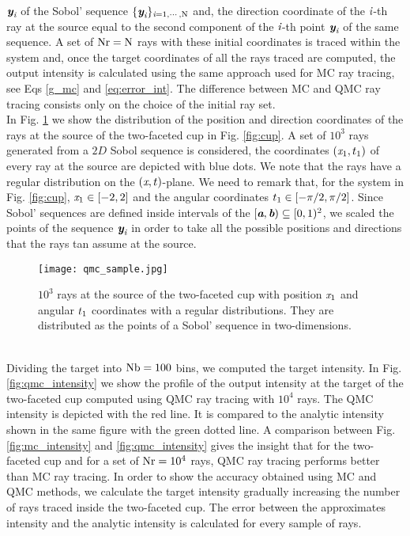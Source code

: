 $\textit{\textbf{y}}_{\textit{i}}$ of the Sobol' sequence  $\{\textit{\textbf{y}}_{\textit{i}}\}_{\textit{i}=1, \cdots, \textrm{N}}$ and, the direction coordinate of the $\textit{i}$-th ray at the source equal to the second component of the $\textit{i}$-th point 
$\textit{\textbf{y}}_{\textit{i}}$ of the same sequence. A set of $\textrm{Nr} = \textrm{N}$ rays with these initial coordinates is traced within the system and, once the target coordinates of all the rays traced are computed, the output intensity is calculated using the same approach used for MC ray tracing, see Eqs \ref{g_mc} and \ref{eq:error_int}. The difference between MC and QMC ray tracing consists only on the choice of the initial ray set.\\ \indent
In Fig. \ref{fig:qmc_sample} we show the distribution of the position and direction coordinates of the rays at the source of the two-faceted cup in Fig. \ref{fig:cup}. 
A set of $10^3$ rays generated from a $2D$ Sobol sequence is considered, the coordinates $(\textit{x}_1, t_1)$ of every ray at the source are depicted with blue dots.
We note that the rays have a regular distribution on the $(\textit{x}, t)$-plane.
We need to remark that, for the system in Fig. \ref{fig:cup}, $\textit{x}_1 \in[-2,2]$ and the angular coordinates $t_1 \in[-\pi/2, \pi/2]$. 
Since Sobol' sequences are defined inside intervals of the  $[\textit{\textbf{a}}, \textit{\textbf{b}})\subseteq[0,1)^2$, we scaled the points of the sequence $\textit{\textbf{y}}_{\textit{i}}$ in order to take all the possible positions and directions that the rays tan assume at the source. 
\begin{figure}[h]
\begin{center}
    \texttt{[image: qmc\_sample.jpg]}
    \caption{$10^3$ rays at the source of the two-faceted cup with position $\textit{x}_1$ and angular $t_1$ coordinates with a regular distributions.
They are distributed as the points of a Sobol' sequence in two-dimensions.}
    \label{fig:qmc_sample}
\end{center}
  \end{figure}
\\ \indent Dividing the target into $\textrm{Nb}=100$ bins, we computed the target intensity. 
In Fig. \ref{fig:qmc_intensity} we show the profile of the output intensity at the target of the two-faceted cup computed using QMC ray tracing with $10^4$ rays. 
The QMC intensity is depicted with the red line. It is compared to the analytic intensity shown in the same figure with the green dotted line.
A comparison between Fig. \ref{fig:mc_intensity} and \ref{fig:qmc_intensity} gives the insight that for the two-faceted cup and for a set of $\textrm{Nr}=10^4$ rays, QMC ray tracing performs better than MC ray tracing. In order to show the accuracy obtained using MC and QMC methods, we calculate the target intensity gradually increasing the number of rays traced inside the two-faceted cup. The error between the approximates intensity and the analytic intensity is calculated for every sample of rays.
